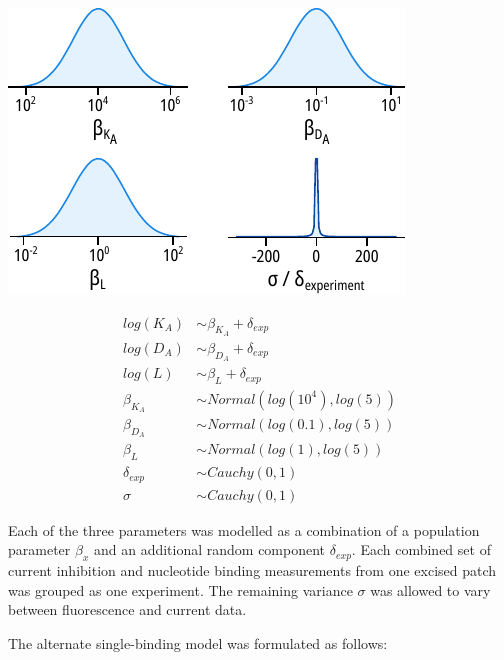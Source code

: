\begin{minipage}{.5\textwidth}
\centering
\includegraphics[width=\textwidth]{mwc_priors.pdf}
\end{minipage}
\begin{minipage}{.5\textwidth}
\centering
\begin{equation} \label{eq:mwc_priors}
\begin{split}
log(K_A) &\sim \beta_{K_A} + \delta_{exp} \\
log(D_A) &\sim \beta_{D_A} + \delta_{exp} \\
log(L) &\sim \beta_{L} + \delta_{exp} \\
\beta_{K_A} &\sim Normal(log(10^4), log(5)) \\
\beta_{D_A} &\sim Normal(log(0.1), log(5)) \\
\beta_{L} &\sim Normal(log(1), log(5)) \\
\delta_{exp} &\sim Cauchy(0, 1) \\
\sigma &\sim Cauchy(0, 1)
\end{split}
\end{equation}
\end{minipage}

Each of the three parameters was modelled as a combination of a population parameter $\beta_x$ and an additional random component $\delta_{exp}$.
Each combined set of current inhibition and nucleotide binding measurements from one excised patch was grouped as one experiment.
The remaining variance $\sigma$ was allowed to vary between fluorescence and current data.

The alternate single-binding model was formulated as follows:

